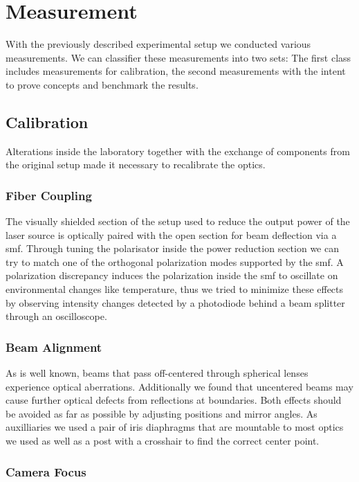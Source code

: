 \chapter{Measurement}

With the previously described experimental setup we conducted various
measurements. We can classifier these measurements into two sets: The first
class includes measurements for calibration, the second measurements with the
intent to prove concepts and benchmark the results.

\section{Calibration}

Alterations inside the laboratory together with the exchange of components
from the original setup made it necessary to recalibrate the optics.

\subsection{Fiber Coupling}

The visually shielded section of the setup used to reduce the output power
of the laser source is optically paired with the open section for beam
deflection via a \gls{smf}. Through tuning the polarisator inside the power
reduction section we can try to match one of the orthogonal polarization
modes supported by the \gls{smf}. A polarization discrepancy induces the
polarization inside the \gls{smf} to oscillate on environmental changes like
temperature, thus we tried to minimize these effects by observing intensity
changes detected by a photodiode behind a beam splitter through an
oscilloscope.

\subsection{Beam Alignment}

As is well known, beams that pass off-centered through spherical lenses
experience optical aberrations. Additionally we found that uncentered beams
may cause further optical defects from reflections at boundaries. Both effects
should be avoided as far as possible by adjusting positions and mirror angles.
As auxilliaries we used a pair of iris diaphragms that are mountable to
most optics we used as well as a post with a crosshair to find the correct
center point.

\subsection{Camera Focus}


